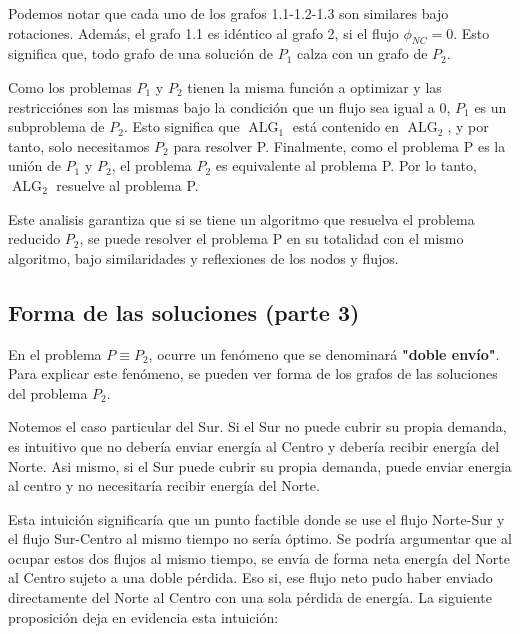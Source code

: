 \documentclass[12pt,twoside]{article}
\begin{document}
	\hspace{1cm} Podemos notar que cada uno de los grafos 1.1-1.2-1.3 son similares bajo rotaciones. Adem\'as, el grafo 1.1 es id\'entico al grafo 2, si el flujo \(\phi_{NC}=0\). Esto significa que, todo grafo de una soluci\'on de \(P_1\) calza con un grafo de \(P_2\).
	
	\hspace{1cm} Como los problemas \(P_1\) y \(P_2\) tienen la misma funci\'on a optimizar y las restricci\'ones son las mismas bajo la condici\'on que un flujo sea igual a 0, \(P_1\) es un subproblema de \(P_2\). Esto significa que \(\operatorname{ALG}_1\) est\'a contenido en \(\operatorname{ALG}_2\), y por tanto, solo necesitamos \(P_2\) para resolver P. Finalmente, como el problema P es la uni\'on de \(P_1\) y \(P_2\), el problema \(P_2\) es equivalente al problema P. Por lo tanto, \(\operatorname{ALG}_2\) resuelve al problema P. 
	
	\hspace{1cm} Este analisis garantiza que si se tiene un algoritmo que resuelva el problema reducido \(P_2\), se puede resolver el problema P en su totalidad con el mismo algoritmo, bajo similaridades y reflexiones de los nodos y flujos.
	
	\subsection{Forma de las soluciones (parte 3)}
	\hspace{1cm} En el problema \(P\equiv P_2\), ocurre un fen\'omeno que se denominar\'a \textbf{"doble env\'io"}. Para explicar este fen\'omeno, se pueden ver forma de los grafos de las soluciones del problema \(P_2\).
	
	\hspace{1cm} Notemos el caso particular del Sur. Si el Sur no puede cubrir su propia demanda, es intuitivo que no deber\'ia enviar energ\'ia al Centro y deber\'ia recibir energ\'ia del Norte. Asi mismo, si el Sur puede cubrir su propia demanda, puede enviar energia al centro y no necesitar\'ia recibir energ\'ia del Norte. 
	
	\hspace{1cm} Esta intuici\'on significar\'ia que un punto factible donde se use el flujo Norte-Sur y el flujo Sur-Centro al mismo tiempo no ser\'ia \'optimo. Se podr\'ia argumentar que al ocupar estos dos flujos al mismo tiempo, se env\'ia de forma neta energ\'ia del Norte al Centro sujeto a una doble p\'erdida. Eso si, ese flujo neto pudo haber enviado directamente del Norte al Centro con una sola p\'erdida de energ\'ia. La siguiente proposici\'on deja en evidencia esta intuici\'on:
	\vspace{0.4cm}
	
\end{document}
